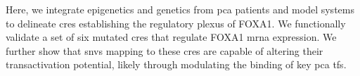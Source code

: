 Here, we integrate epigenetics and genetics from \gls{pca} patients and model systems to delineate \glspl{cre} establishing the regulatory plexus of FOXA1.
We functionally validate a set of six mutated \glspl{cre} that regulate FOXA1 \gls{mrna} expression.
We further show that \glspl{snv} mapping to these \glspl{cre} are capable of altering their transactivation potential, likely through modulating the binding of key \gls{pca} \glspl{tf}.
